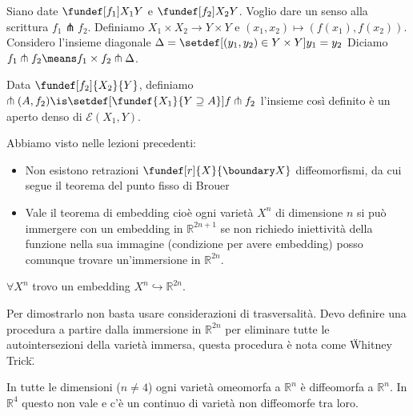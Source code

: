 
\begin{defn}
Siano date $\fundef[f_{1}]{X_{1}}{Y}$ e $\fundef[f_{2}]{X_{2}}{Y}$. Voglio dare un senso alla scrittura $f_{1} \pitchfork f_{2}$.
Definiamo $X_{1} \times X_{2} \rightarrow Y \times Y$ e $(x_{1}, x_{2}) \mapsto (f(x_{1}), f(x_{2}))$. Considero l'insieme diagonale $\Delta = \setdef[(y_{1}, y_{2}) \in Y \times Y]{y_{1} = y_{2}}$
Diciamo $f_{1} \pitchfork f_{2} \means f_{1} \times f_{2} \pitchfork \Delta$.
\end{defn}

\begin{teo}
Data $\fundef[f_2]{X_2}{Y}$, definiamo $\pitchfork(A, f_{2}) \is \setdef[\fundef{X_{1}}{Y \supseteq A}] {f\pitchfork f_{2}}$ l'insieme così definito è un aperto denso di $\mathcal{E}(X_{1}, Y)$.
\end{teo}

Abbiamo visto nelle lezioni precedenti:

\begin{itemize}
 \item Non esistono retrazioni $\fundef[r]{X}{\boundary X}$ diffeomorfismi, da cui segue il teorema del punto fisso di Brouer
 \item Vale il teorema di embedding cioè ogni varietà $X^{n}$ di dimensione $n$ si può immergere con un embedding in $\mathbb{R}^{2n+1}$ se non richiedo iniettività della funzione nella sua 
 immagine (condizione per avere embedding) posso comunque trovare un'immersione in $\mathbb{R}^{2n}$. 
\end{itemize}

\begin{teo}  
$\forall X^{n}$ trovo un embedding $X^{n} \hookrightarrow \mathbb{R}^{2n}$.
\end{teo}

\begin{oss}
 Per dimostrarlo non basta usare considerazioni di trasversalità. Devo definire una procedura a partire dalla immersione in $\mathbb{R}^{2n}$ per
 eliminare tutte le autointersezioni della varietà immersa, questa procedura è nota come \"Whitney Trick\".
\end{oss}

\begin{oss} %
 In tutte le dimensioni ($n \neq 4$) ogni varietà omeomorfa a $\mathbb{R}^{n}$ è diffeomorfa a  $\mathbb{R}^{n}$. In $\mathbb{R}^{4}$ questo non vale e c'è un continuo di varietà 
 non diffeomorfe tra loro.
\end{oss}

